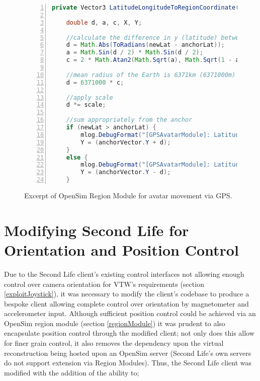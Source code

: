 \begin{figure}[h]
\begin{lstlisting}[language=Java, numbers=left, numberstyle=\small, stepnumber=1, frame=single, breaklines=true, backgroundcolor=\color{codebackground}, showstringspaces=false]
private Vector3 LatitudeLongitudeToRegionCoordinate(double newLat, double newLong, double anchorLat, double anchorLong, Vector3 anchorVector, double scale) {

    double d, a, c, X, Y;

    //calculate the difference in y (latitude) between the anchor & the new reading
    d = Math.Abs(ToRadians(newLat - anchorLat));
    a = Math.Sin(d / 2) * Math.Sin(d / 2);
    c = 2 * Math.Atan2(Math.Sqrt(a), Math.Sqrt(1 - a));

    //mean radius of the Earth is 6371km (6371000m)
    d = 6371000 * c;

    //apply scale
    d *= scale;

    //sum appropriately from the anchor
    if (newLat > anchorLat) {
        mlog.DebugFormat("[GPSAvatarModule]: LatitudeLongitudeToRegionCoordinate() - (Y) newLat > anchorLat.");
        Y = (anchorVector.Y + d);
    }
    else {
        mlog.DebugFormat("[GPSAvatarModule]: LatitudeLongitudeToRegionCoordinate() - (Y) newLat < anchorLat.");
        Y = (anchorVector.Y - d);
    }
\end{lstlisting}
\caption{Excerpt of OpenSim Region Module for avatar movement via GPS.}
\label{RegionModuleCode1}
\end{figure}




\section{Modifying Second Life for Orientation and Position Control}

Due to the Second Life client's existing control interfaces not allowing enough control over camera orientation for VTW's requirements (section \ref{exploitJoystick}), it was necessary to modify the client's codebase to produce a bespoke client allowing complete control over orientation by magnetometer and accelerometer input. Although sufficient position control could be achieved via an OpenSim region module (section \ref{regionModule}) it was prudent to also encapsulate position control through the modified client; not only does this allow for finer grain control, it also removes the dependency upon the virtual reconstruction being hosted upon an OpenSim server (Second Life's own servers do not support extension via Region Modules). Thus, the Second Life client was modified with the addition of the ability to;

